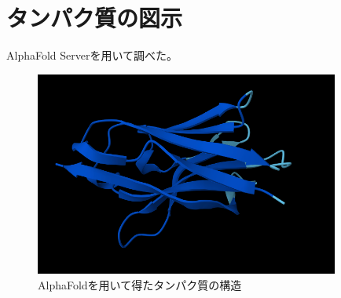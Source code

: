 \documentclass[dvipdfmx, openany,10pt]{jsarticle}
\begin{document}
{\small\section{タンパク質の図示}}
AlphaFold Serverを用いて調べた。
\begin{figure}[htbp]
 \begin{center}
  \includegraphics[width=100mm]{alphafold.png}
 \end{center}
 \caption{AlphaFoldを用いて得たタンパク質の構造}
 \label{fig:one}
\end{figure}



\end{document}
